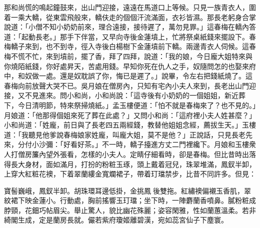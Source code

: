 那和尚慌的鳴起鐘鼓來，出山門迎接，遠遠在馬道口上等候。只見一族青衣人，圍着一乘大轎，從東雲飛般來，轎伕走的個個汗流滿面，衣衫皆濕。那長老躬身合掌說道：「小僧不知小奶奶前來，理合遠接，接待遲了，萬勿見罪。」這春梅在轎內答道：「起動長老。」那手下伴當，又早向寺後金蓮墳上，忙將祭桌紙錢來擺設下。春梅轎子來到，也不到寺，徑入寺後白楊樹下金蓮墳前下轎。兩邊青衣人伺候。這春梅不慌不忙，來到墳前，擺了香，拜了四拜，說道：「我的娘，今日龐大姐特來與你燒陌紙錢，你好處昇天，苦處用錢。早知你死在仇人之手，奴隨問怎的也娶來府中，和奴做一處。還是奴耽誤了你，悔已是遲了。」說畢，令左右把錢紙燒了。這春梅向前放聲大哭不已。吳月娘在僧房內，只知有宅內小夫人來到，長老出山門迎接，又不見進來。問小和尚，小和尚說：「這寺後有小奶奶的一個姐姐，新近葬下，今日清明節，特來祭掃燒紙。」孟玉樓便道：「怕不就是春梅來了？也不見的。」月娘道：「他那得個姐來死了葬在此處？」又問小和尚：「這府裡小夫人姓甚麼？」小和尚道：「姓龐，前日與了長老四五兩經錢，教替他姐姐念經，薦拔生天。」玉樓道：「我聽見他爹說春梅娘家姓龐，叫龐大姐，莫不是他？」正說話，只見長老先來，分付小沙彌：「好看好茶。」不一時，轎子擡進方丈二門裡纔下。月娘和玉樓衆人打僧房簾內望外張看，怎樣的小夫人。定睛仔細看時，卻是春梅。但比昔時出落得長大身材，面如滿月，打扮的粉粧玉琢，頭上戴着冠兒，珠翠堆滿，鳳釵半卸，上穿大紅粧花襖，下着翠蘭縷金寬斕裙子，帶着玎璫禁步，比昔不同許多。但見：

\begin{myquote}
寶髻巍峨，鳳釵半卸。胡珠環耳邊低掛，金挑鳳𩬆後雙拖。紅繡襖偏襯玉香肌，翠紋裙下映金蓮小。行動處，胸前搖響玉玎璫；坐下時，一陣麝蘭香噴鼻。膩粉粧成脖頸，花鈿巧帖眉尖。舉止驚人，貌比幽花殊麗；姿容閑雅，性如蘭蕙溫柔。若非綺閣生成，定是蘭房長就。{}儼若紫府瓊姬離碧漢，宛如蕊宮仙子下塵寰。
\end{myquote}

